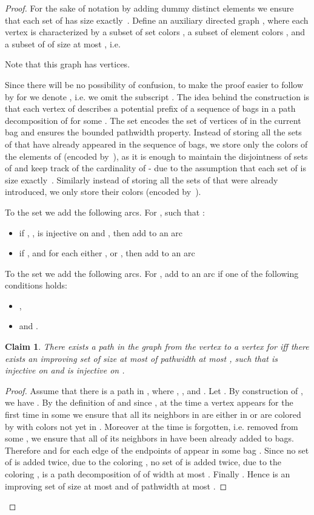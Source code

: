 \documentclass[11pt]{article}
\newtheorem{claim}[theorem]{Claim}
\theoremstyle{definition}
\begin{document}
\begin{proof}
For the sake of notation by adding dummy distinct elements we ensure 
that each set of  has size exactly~.
Define an auxiliary directed graph ,
where each vertex is characterized by a subset of set colors ,
a subset of element colors , and a subset of  of size at most ,
i.e.  

Note that this graph has  vertices.

Since there will be no possibility of confusion, to make the proof easier
to follow by  for  we denote ,
i.e. we omit the subscript .
The idea behind the construction is that each vertex of  describes
a potential prefix of a sequence of bags in a path decomposition of 
for some .
The set  encodes the set of vertices of  in the current bag
and ensures the bounded pathwidth property.
Instead of storing all the sets of  that have already appeared in the 
sequence of bags, we store only the colors of the elements of  (encoded by~),
as it is enough to maintain the disjointness of sets of 
and keep track of the cardinality of  - due to the assumption that each 
set of is size exactly~.
Similarly instead of storing all the sets of 
that were already introduced, we only store their colors (encoded by~).

To the set  we add the following arcs.
For , 
such that :
\begin{itemize}
  \item if , ,  is injective on  
  and ,
  then add to  an arc 
  \item if ,  and for each  
  either , or ,
  then add to  an arc 
\end{itemize}

To the set  we add the following arcs.
For ,   add to 
an arc  
if one of the following conditions holds:
\begin{itemize}
  \item ,
  \item  and .
\end{itemize}

\begin{claim}
There exists a path in the graph  from the vertex 
to a vertex  for 
iff
there exists an improving set  of size at most  of pathwidth at most ,
such that  is injective on  and  is injective on .
\end{claim}

\begin{proof}
Assume that there is a path  in ,
where ,  ,  and .
Let .
By construction of , we have .
By the definition of  and 
since , at the time a vertex  appears
for the first time in some  we ensure that all its neighbors in 
are either in  or are colored by  with colors not yet in .
Moreover at the time  is forgotten, i.e. removed from some ,
we ensure that all of its neighbors in  have been already added to bags.
Therefore  and for each 
edge  of  the endpoints of  appear in some bag .
Since no set of  is added twice, due to the coloring ,
no set of  is added twice, due to the coloring ,
 is a path decomposition of  of width at most .
Finally .
Hence  is an improving set of size at most  and of pathwidth at most .


\end{proof}
\end{proof}
\end{document}
